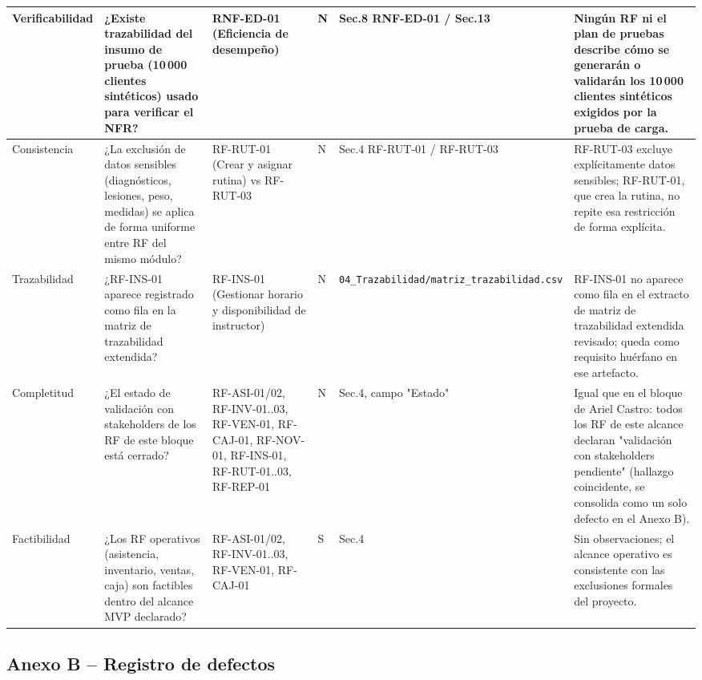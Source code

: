 \documentclass[11pt,a4paper]{article}
\begin{document}
\begin{landscape}
\begin{longtable}{|L{2.4cm}|L{4.6cm}|L{4.0cm}|C{1.3cm}|L{4.2cm}|L{6.5cm}|}
Verificabilidad & ¿Existe trazabilidad del insumo de prueba (10\,000 clientes sintéticos) usado para verificar el NFR? & RNF-ED-01 (Eficiencia de desempeño) & N & Sec.8 RNF-ED-01 / Sec.13 & Ningún RF ni el plan de pruebas describe cómo se generarán o validarán los 10\,000 clientes sintéticos exigidos por la prueba de carga. \\ \hline
Consistencia & ¿La exclusión de datos sensibles (diagnósticos, lesiones, peso, medidas) se aplica de forma uniforme entre RF del mismo módulo? & RF-RUT-01 (Crear y asignar rutina) vs RF-RUT-03 & N & Sec.4 RF-RUT-01 / RF-RUT-03 & RF-RUT-03 excluye explícitamente datos sensibles; RF-RUT-01, que crea la rutina, no repite esa restricción de forma explícita. \\ \hline
Trazabilidad & ¿RF-INS-01 aparece registrado como fila en la matriz de trazabilidad extendida? & RF-INS-01 (Gestionar horario y disponibilidad de instructor) & N & \nolinkurl{04_Trazabilidad/matriz_trazabilidad.csv} & RF-INS-01 no aparece como fila en el extracto de matriz de trazabilidad extendida revisado; queda como requisito huérfano en ese artefacto. \\ \hline
Completitud & ¿El estado de validación con stakeholders de los RF de este bloque está cerrado? & RF-ASI-01/02, RF-INV-01..03, RF-VEN-01, RF-CAJ-01, RF-NOV-01, RF-INS-01, RF-RUT-01..03, RF-REP-01 & N & Sec.4, campo "Estado" & Igual que en el bloque de Ariel Castro: todos los RF de este alcance declaran "validación con stakeholders pendiente" (hallazgo coincidente, se consolida como un solo defecto en el Anexo B). \\ \hline
Factibilidad & ¿Los RF operativos (asistencia, inventario, ventas, caja) son factibles dentro del alcance MVP declarado? & RF-ASI-01/02, RF-INV-01..03, RF-VEN-01, RF-CAJ-01 & S & Sec.4 & Sin observaciones; el alcance operativo es consistente con las exclusiones formales del proyecto. \\ \hline
\end{longtable}
\normalsize
\end{landscape}

\subsection*{Anexo B -- Registro de defectos}
\end{document}
